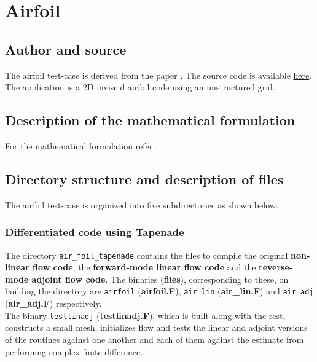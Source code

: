 \section{Airfoil}
\subsection{Author and source}
The airfoil test-case is derived from the paper \cite{Giles_2005}. The source code is available \href{http://people.maths.ox.ac.uk/gilesm/codes/airfoil/bangalore05.tar}{here}. The application is a 2D inviscid airfoil code using an unstructured grid. 
\subsection{Description of the mathematical formulation}
For the mathematical formulation refer \cite{Giles_2005}.

\subsection{Directory structure and description of files}
The airfoil test-case is organized into five subdirectories as shown below:\\
\subsubsection{Differentiated code using Tapenade}
The directory \texttt{air\_foil\_tapenade} contains the files to compile the original \textbf{non-linear flow code}, the \textbf{forward-mode linear flow code} and the \textbf{reverse-mode adjoint flow code}. The binaries (\textbf{files}), corresponding to these, on building the directory are \texttt{airfoil} (\textbf{{airfoil.F}}), \texttt{air\_lin} (\textbf{{air\_lin.F}}) and \texttt{air\_adj} (\textbf{{air\_adj.F}}) respectively. \\

\noindent The binary \texttt{testlinadj} (\textbf{{testlinadj.F}}), which is built along with the rest, constructs a small mesh, initializes flow and tests the linear and adjoint versions of the routines against one another and each of them against the estimate from performing complex finite difference. \\

